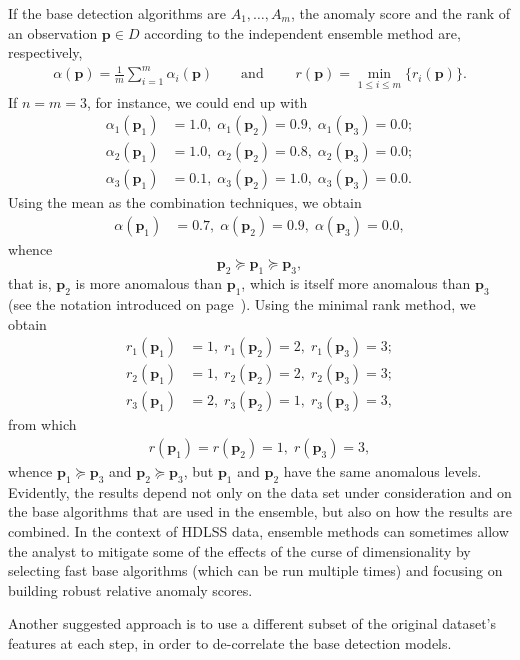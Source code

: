 \par If the base detection algorithms are $A_1, \ldots, A_m$, the anomaly score and the rank of an observation $\mathbf{p}\in D$ according to the independent ensemble method are, respectively, 
\begin{align*}
\alpha(\mathbf{p})=\frac{1}{m}\sum_{i=1}^{m}\alpha_i(\mathbf{p}) \qquad \text{and}\; \qquad r(\mathbf{p}) =\min_{1\leq i \leq m} \{r_i(\mathbf{p})\}.
\end{align*}
If $n=m=3$, for instance, we could end up with 
\begin{align*}\alpha_{1}\left(\mathbf{p}_{1}\right)&=1.0,\; \alpha_{1}\left(\mathbf{p}_{2}\right)=0.9,\; \alpha_{1}\left(\mathbf{p}_{3}\right)=0.0; \\ 
\alpha_{2}\left(\mathbf{p}_{1}\right)&=1.0,\; \alpha_{2}\left(\mathbf{p}_{2}\right)=0.8,\; \alpha_{2}\left(\mathbf{p}_{3}\right)=0.0;\\
\alpha_{3}\left(\mathbf{p}_{1}\right)&=0.1,\;  \alpha_{3}\left(\mathbf{p}_{2}\right)=1.0,\; \alpha_{3}\left(\mathbf{p}_{3}\right)=0.0.
\end{align*}
Using the mean as the combination techniques, we obtain
\begin{align*}
\alpha\left(\mathbf{p}_{1}\right)&=0.7,\; \alpha\left(\mathbf{p}_{2}\right)=0.9,\; \alpha\left(\mathbf{p}_{3}\right)=0.0,
\end{align*}
whence $$\mathbf{p}_2\succeq \mathbf{p}_1\succeq \mathbf{p}_3,$$ that is, $\mathbf{p}_2$ is more anomalous than $\mathbf{p}_1$, which is itself more anomalous than  $\mathbf{p}_3$ (see the notation introduced on page~\pageref{succeq}). 
\newl 
Using the minimal rank method, we obtain 
\begin{align*}
r_{1}\left(\mathbf{p}_{1}\right)&=1,\; r_{1}\left(\mathbf{p}_{2}\right)=2,\; r_{1}\left(\mathbf{p}_{3}\right)=3;\\ 
r_{2}\left(\mathbf{p}_{1}\right)&=1,\; r_{2}\left(\mathbf{p}_{2}\right)=2,\; r_{2}\left(\mathbf{p}_{3}\right)=3;\\
r_{3}\left(\mathbf{p}_{1}\right)&=2,\; r_{3}\left(\mathbf{p}_{2}\right)=1,\; r_{3}\left(\mathbf{p}_{3}\right)=3,
\end{align*}
from which 
\begin{align*}
r\left(\mathbf{p}_{1}\right)=r\left(\mathbf{p}_{2}\right)=1,\; r \left(\mathbf{p}_{3}\right)=3, 
\end{align*}
whence $\mathbf{p}_1\succeq \mathbf{p}_3$ and $\mathbf{p}_2\succeq \mathbf{p}_3$, but $\mathbf{p}_1$ and  $\mathbf{p}_2$ have the same anomalous levels. 
\newl Evidently, the results depend not only on the data set under consideration and on the base algorithms that are used in the ensemble, but also on how the results are combined. 
\newl In the context of HDLSS data, ensemble methods can sometimes allow the analyst to mitigate some of the effects of the curse of dimensionality by selecting fast base algorithms (which can be run multiple times) and focusing on building robust relative anomaly scores. \par Another suggested  approach is to use a different subset of the original dataset's features at each step, in order to de-correlate the base detection models. 
%
%


